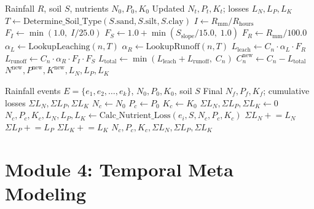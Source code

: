 \documentclass[conference]{IEEEtran}
\begin{document}
\begin{algorithm}[htbp]
\caption{Nutrient Loss Calculation (Single Rainfall Event)}
\label{alg:nutrientloss}
\begin{algorithmic}[1]
\Require Rainfall $R$, soil $S$, nutrients $N_0, P_0, K_0$
\Ensure Updated $N_t, P_t, K_t$; losses $L_N, L_P, L_K$
\State $T \gets \mathrm{Determine\_Soil\_Type}(S.\mathrm{sand}, S.\mathrm{silt}, S.\mathrm{clay})$
\State $I \gets R_{\mathrm{mm}} / R_{\mathrm{hours}}$
\State $F_I \gets \min(1.0,\; I / 25.0)$
\State $F_S \gets 1.0 + \min(S_{\mathrm{slope}} / 15.0,\; 1.0)$
\State $F_R \gets R_{\mathrm{mm}} / 100.0$
  \State $\alpha_L \gets \mathrm{LookupLeaching}(n, T)$
  \State $\alpha_R \gets \mathrm{LookupRunoff}(n, T)$
  \State $L_{\mathrm{leach}} \gets C_n \cdot \alpha_L \cdot F_R$
  \State $L_{\mathrm{runoff}} \gets C_n \cdot \alpha_R \cdot F_I \cdot F_S$
  \State $L_{\mathrm{total}} \gets \min(L_{\mathrm{leach}} + L_{\mathrm{runoff}},\; C_n)$
  \State $C_n^{\mathrm{new}} \gets C_n - L_{\mathrm{total}}$
\EndFor
\State \Return $N^{\mathrm{new}}, P^{\mathrm{new}}, K^{\mathrm{new}}, L_N, L_P, L_K$
\end{algorithmic}
\end{algorithm}

\begin{algorithm}[htbp]
\caption{Cumulative Nutrient Depletion (Multi-Event)}
\label{alg:cumulative}
\begin{algorithmic}[1]
\Require Rainfall events $E = \{e_1, e_2, \ldots, e_k\}$, $N_0, P_0, K_0$, soil $S$
\Ensure Final $N_f, P_f, K_f$; cumulative losses $\Sigma L_N, \Sigma L_P, \Sigma L_K$
\State $N_c \gets N_0$\; $P_c \gets P_0$\; $K_c \gets K_0$
\State $\Sigma L_N, \Sigma L_P, \Sigma L_K \gets 0$
  \State $N_c, P_c, K_c, L_N, L_P, L_K \gets
         \mathrm{Calc\_Nutrient\_Loss}(e_i, S, N_c, P_c, K_c)$
  \State $\Sigma L_N \mathrel{+}= L_N$
  \State $\Sigma L_P \mathrel{+}= L_P$
  \State $\Sigma L_K \mathrel{+}= L_K$
\EndFor
\State \Return $N_c, P_c, K_c, \Sigma L_N, \Sigma L_P, \Sigma L_K$
\end{algorithmic}
\end{algorithm}

\section{Module 4: Temporal Meta Modeling}
\label{sec:module4}
\end{document}
